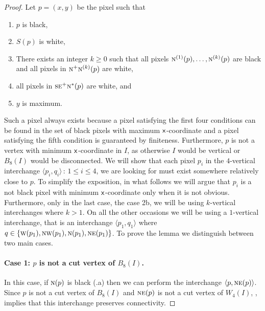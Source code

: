 \documentclass[lotsofwhite,charterfonts]{patmorin}
\newcommand{\N}{\textsc{n}}
\newcommand{\NE}{\textsc{ne}}
\newcommand{\E}{\textsc{e}}
\renewcommand{\S}{\textsc{s}}
\newcommand{\W}{\textsc{w}}
\newcommand{\NW}{\textsc{nw}}
\newcommand{\x}{\ensuremath{\protect\textup{\textsf{x}}}}
\newcommand{\ic}[2]{\langle #1,#2 \rangle}
\begin{document}
\begin{proof}
Let $p=(x,y)$ be the pixel such that
\begin{enumerate}
  \item $p$ is black, 
  \item $S(p)$ is white,
  \item There exists an integer $k\ge 0$ such that all pixels
	$\N^{(1)}(p),\ldots,\N^{(k)}(p)$ are black and 
        all pixels in $\N^{+}\N^{(k)}(p)$ are white,
  \item all pixels in $\S\E^+\N^*(p)$ are white, and
  \item $y$ is maximum.
\end{enumerate}
Such a pixel always exists because a pixel satisfying the first four conditions can be found in the set of black pixels with maximum \x-coordinate and a pixel satisfying the fifth condition is guaranteed by finiteness. Furthermore, $p$ is not a vertex with minimum \x-coordinate in $I$, as otherwise $I$ would be vertical or $B_8(I)$ would be disconnected. We will show that each pixel $p_i$ in the $4$-vertical interchange $\ic{p_i}{q_i}\, :\,1\leq i\leq 4$,  we are looking for must exist somewhere relatively close to $p$. To simplify the exposition, in what follows we will argue that $p_i$ is a not black pixel with minimum \x-coordinate only when it is not obvious. Furthermore, only in the last case, the case 2b, we will be using $k$-vertical interchanges where $k>1$. On all the other occasions we will be using a $1$-vertical interchange, that is an interchange $\ic{p_1}{q_1}$ where $q\in\{\W(p_1),\NW(p_1),\N(p_1),\NE(p_1)\}$. To prove the lemma we distinguish between two main cases.

\paragraph{Case 1: $p$ is not a cut vertex of $B_8(I)$.} 

In this case, if $\N(p)$ is black (.a) then we can perform
the interchange $\ic{p}{\NE(p)}$.  Since $p$ is not a cut vertex of
$B_8(I)$ and $\NE(p)$ is not a cut vertex of $W_4(I)$,
, implies that this interchange preserves
connectivity.



\end{proof}
\end{document}
